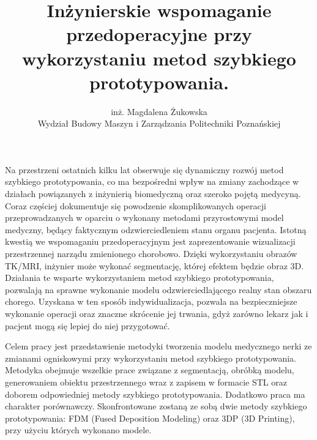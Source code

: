 \documentclass[12pt, a4paper]{article}
\begin{document}
\title{Inżynierskie wspomaganie przedoperacyjne przy wykorzystaniu metod szybkiego prototypowania.}
\author{inż. Magdalena Żukowska \\ Wydział Budowy Maszyn i Zarządzania Politechniki Poznańskiej}
\date {}
\maketitle
\thispagestyle{title}
Na przestrzeni ostatnich kilku lat obserwuje się dynamiczny rozwój metod szybkiego prototypowania, co ma bezpośredni wpływ na zmiany zachodzące w działach powiązanych z inżynierią biomedyczną oraz szeroko pojętą medycyną. Coraz częściej dokumentuje się powodzenie skomplikowanych operacji przeprowadzanych w oparciu o wykonany metodami przyrostowymi model medyczny, będący faktycznym odzwierciedleniem stanu organu pacjenta. Istotną kwestią we wspomaganiu przedoperacyjnym jest zaprezentowanie wizualizacji przestrzennej narządu zmienionego chorobowo. Dzięki wykorzystaniu obrazów TK/MRI, inżynier może wykonać segmentację, której efektem będzie obraz 3D. Działania te wsparte wykorzystaniem metod szybkiego prototypowania, pozwalają na sprawne wykonanie modelu odzwierciedlającego realny stan obszaru chorego. Uzyskana w ten sposób indywidualizacja, pozwala na bezpieczniejsze wykonanie operacji oraz znaczne skrócenie jej trwania, gdyż zarówno lekarz jak i pacjent mogą się lepiej do niej przygotować.

Celem pracy jest przedstawienie metodyki tworzenia modelu medycznego nerki ze zmianami ogniskowymi przy wykorzystaniu metod szybkiego prototypowania. Metodyka obejmuje wszelkie prace związane z segmentacją, obróbką modelu, generowaniem obiektu przestrzennego wraz z zapisem w formacie STL oraz doborem odpowiedniej metody szybkiego prototypowania. Dodatkowo praca ma charakter porównawczy. Skonfrontowane zostaną ze sobą dwie metody szybkiego prototypowania: FDM (Fused Deposition Modeling) oraz 3DP (3D Printing), przy użyciu których wykonano modele. 
\end{document}
